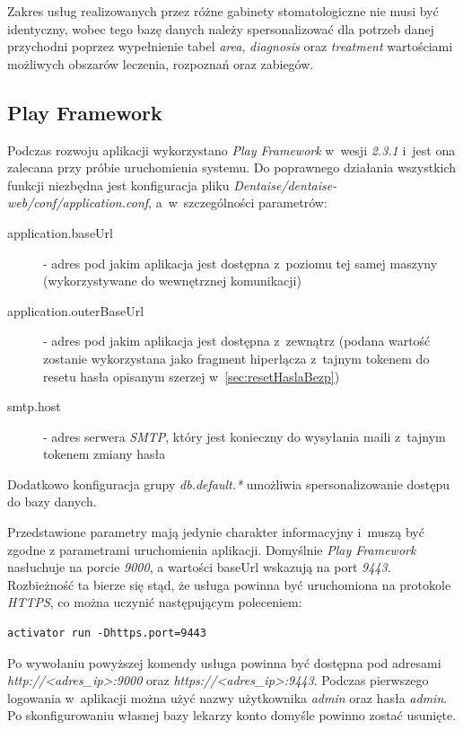 \documentclass[11pt]{aghdpl}
\begin{document}
Zakres usług realizowanych przez różne gabinety stomatologiczne nie musi być identyczny, wobec tego bazę danych należy spersonalizować dla potrzeb danej przychodni poprzez wypełnienie tabel \emph{area}, \emph{diagnosis} oraz \emph{treatment} wartościami możliwych obszarów leczenia, rozpoznań oraz zabiegów.

\subsection{Play Framework}
\label{sec:playFramework}

Podczas rozwoju aplikacji wykorzystano \emph{Play Framework} w~wesji \emph{2.3.1} i~jest ona zalecana przy próbie uruchomienia systemu. Do poprawnego działania wszystkich funkcji niezbędna jest konfiguracja pliku \emph{Dentaise/dentaise-web/conf/application.conf}, a~w~szczególności parametrów:
\begin{description}
\item[application.baseUrl] - adres pod jakim aplikacja jest dostępna z~poziomu tej samej maszyny (wykorzystywane do wewnętrznej komunikacji)
\item[application.outerBaseUrl] - adres pod jakim aplikacja jest dostępna z~zewnątrz (podana wartość zostanie wykorzystana jako fragment hiperłącza z~tajnym tokenem do resetu hasła opisanym szerzej w~\ref{sec:resetHaslaBezp})
\item[smtp.host] - adres serwera \emph{SMTP}, który jest konieczny do wysyłania maili z~tajnym tokenem zmiany hasła
\end{description}
Dodatkowo konfiguracja grupy \emph{db.default.*} umożliwia spersonalizowanie dostępu do bazy danych.

Przedstawione parametry mają jedynie charakter informacyjny i~muszą być zgodne z parametrami uruchomienia aplikacji. Domyślnie \emph{Play Framework} nasłuchuje na porcie \emph{9000}, a wartości baseUrl wskazują na port \emph{9443}. Rozbieżność ta bierze się stąd, że usługa powinna być uruchomiona na protokole \emph{HTTPS}, co można uczynić następującym poleceniem:

\begin{lstlisting}
activator run -Dhttps.port=9443
\end{lstlisting}

Po wywołaniu powyższej komendy usługa powinna być dostępna pod adresami \emph{http://<adres\_ip>:9000} oraz \emph{https://<adres\_ip>:9443}. Podczas pierwszego logowania w~aplikacji można użyć nazwy użytkownika \emph{admin} oraz hasła \emph{admin}. Po skonfigurowaniu własnej bazy lekarzy konto domyśle powinno zostać usunięte.
\end{document}
